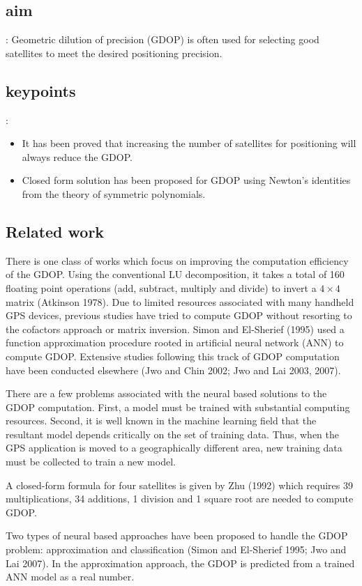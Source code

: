 \documentclass[a4paper]{report}
\begin{document}
\subsection{aim}:
Geometric dilution of precision (GDOP) is often used for selecting good satellites to meet the desired positioning precision.
\subsection{keypoints}:
\begin{itemize}
	\item It has been proved that increasing the number of satellites for positioning will always reduce the GDOP.
	\item Closed form solution has been proposed for GDOP using Newton’s identities from the
	theory of symmetric polynomials.
\end{itemize}

\subsection{Related work}
There is one class of works which focus on improving the computation efficiency of the GDOP.
Using the conventional LU decomposition, it takes a total of 160 floating
point operations (add, subtract, multiply and divide) to
invert a $4 \times 4$ matrix (Atkinson 1978). Due to limited resources associated with many handheld
GPS devices, previous studies have tried to compute
GDOP without resorting to the cofactors approach or
matrix inversion. Simon and El-Sherief (1995) used a
function approximation procedure rooted in artificial neural
network (ANN) to compute GDOP. Extensive studies following
this track of GDOP computation have been
conducted elsewhere (Jwo and Chin 2002; Jwo and Lai
2003, 2007).

There are a few problems associated with the neural
based solutions to the GDOP computation. First, a model
must be trained with substantial computing resources.
Second, it is well known in the machine learning field that
the resultant model depends critically on the set of training
data. Thus, when the GPS application is moved to a geographically
different area, new training data must be
collected to train a new model.

A closed-form formula for four satellites is given by Zhu (1992) which requires
39 multiplications, 34 additions, 1 division and 1 square root are needed to compute GDOP.

Two types of neural based approaches have been proposed
to handle the GDOP problem: approximation and classification
(Simon and El-Sherief 1995; Jwo and Lai 2007). In
the approximation approach, the GDOP is predicted from a
trained ANN model as a real number.
\end{document}

